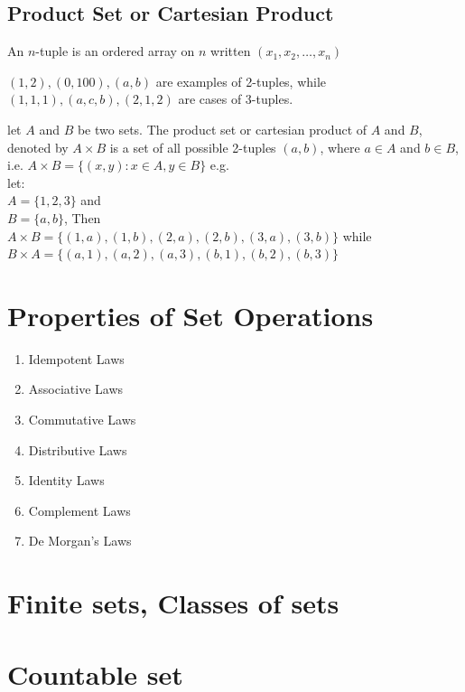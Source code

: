 \subsection{Product Set or Cartesian Product}
\begin{para}
    An $n$-tuple is an ordered array on $n$ written $(x_1,x_2,\ldots,x_n)$
\end{para}
\begin{para}
    $(1,2), (0, 100), (a, b)$ are examples of 2-tuples, while $(1,1,1), (a,c,b), (2,1,2)$ are cases of 3-tuples.
\end{para}

\begin{para}
    let $A$ and $B$ be two sets. The product set or cartesian product of $A$ and $B$, denoted by $A \times B$ is a set of all possible 2-tuples $(a,b)$, where $a \in A$ and $b \in B$, i.e. $A \times B = \{(x,y): x \in A, y \in B\}$ e.g. \\
    let:\\
    $A=\{1,2,3\}$ and\\
    $B=\{a,b\}$, Then \\
    $A \times B = \{(1,a),(1,b),(2,a),(2,b),(3,a),(3,b)\}$ while\\
    $B \times A = \{(a,1),(a,2),(a,3),(b,1),(b,2),(b,3)\}$
\end{para}

\section{Properties of Set Operations}

\begin{enumerate}
    \item Idempotent Laws
    \item Associative Laws
    \item Commutative Laws
    \item Distributive Laws
    \item Identity Laws
    \item Complement Laws
    \item De Morgan's Laws
\end{enumerate}
\section{Finite sets, Classes of sets}
\section{Countable set}